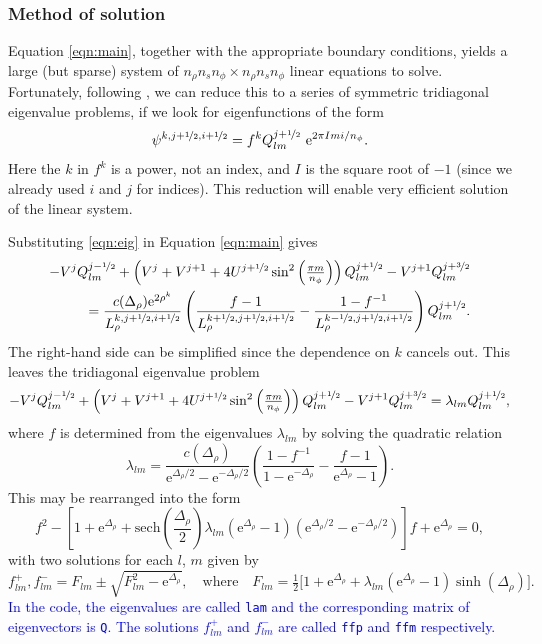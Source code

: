 \documentclass[11pt]{article}
\newcommand{\dr}{\Delta_\rho}
\newcommand{\nr}{n_\rho}
\newcommand{\ns}{n_s}
\newcommand{\nph}{n_\phi}
\newcommand{\half}{\nicefrac{1}{2}}
\newcommand{\thr}{\nicefrac{3}{2}}
\newcommand{\ex}{\,\mathrm{e}}
\begin{document}
\subsubsection{Method of solution}

Equation \eqref{eqn:main}, together with the appropriate boundary conditions, yields a large (but sparse) system of $\nr\ns\nph\times \nr\ns\nph$ linear equations to solve. Fortunately, following \cite{vanballe2000}, we can reduce this to a series of symmetric tridiagonal eigenvalue problems, if we look for eigenfunctions of the form
\begin{equation}
\psi^{k,j+\half,i+\half} = f^kQ_{lm}^{j+\half}\,\ex^{2\pi I mi/\nph}.
\label{eqn:eig}
\end{equation}
Here the $k$ in $f^k$ is a power, not an index, and $I$ is the square root of $-1$ (since we already used $i$ and $j$ for indices). This reduction will enable very efficient solution of the linear system.

Substituting \eqref{eqn:eig} in Equation \eqref{eqn:main} gives
\begin{align}
-V^{j}Q^{j-\half}_{lm} + \left(V^{j} + V^{j+1}+ 4U^{j+\half}\sin^2\left(\tfrac{\pi m}{\nph}\right) \right)Q^{j+\half}_{lm} - V^{j+1}Q^{j+\thr}_{lm} \nonumber\\
= \frac{c(\dr)\mathrm{e}^{2\rho^k}}{L_\rho^{k,j+\half,i+\half}}\left(\frac{f - 1}{L_\rho^{k+\half,j+\half,i+\half}} - \frac{1 - f^{-1}}{L_\rho^{k-\half,j+\half,i+\half}} \right)Q_{lm}^{j+\half}.
\end{align}
The right-hand side can be simplified since the dependence on $k$ cancels out. This leaves the tridiagonal eigenvalue problem
\begin{equation}
-V^{j}Q^{j-\half}_{lm} + \left(V^{j} + V^{j+1}+ 4U^{j+\half}\sin^2\left(\tfrac{\pi m}{\nph}\right) \right)Q^{j+\half}_{lm} - V^{j+1}Q^{j+\thr}_{lm} = \lambda_{lm}Q_{lm}^{j+\half},
\end{equation}
where $f$ is determined from the eigenvalues $\lambda_{lm}$ by solving the quadratic relation
\begin{equation}
\lambda_{lm} = \frac{c(\dr)}{\mathrm{e}^{\dr/2} - \mathrm{e}^{-\dr/2}} \left(\frac{1-f^{-1}}{1-\mathrm{e}^{-\dr}} - \frac{f-1}{\mathrm{e}^{\dr} - 1}\right).
\end{equation}
This may be rearranged into the form
\begin{equation}
f^2 - \left[1 + \mathrm{e}^{\dr} + \mathrm{sech}\left(\frac{\dr}{2}\right)\lambda_{lm}(\mathrm{e}^{\dr}-1)(\mathrm{e}^{\dr/2} - \mathrm{e}^{-\dr/2}) \right]f + \mathrm{e}^{\dr} = 0,
\end{equation}
with two solutions for each $l$, $m$ given by
\begin{equation}
f_{lm}^+, f_{lm}^- = F_{lm} \pm \sqrt{F_{lm}^2 - \mathrm{e}^{\dr}}, \quad \textrm{where} \quad F_{lm} = \tfrac12\Big[1 + \mathrm{e}^{\dr} + \lambda_{lm}(\mathrm{e}^{\dr}-1)\sinh(\dr) \Big].
\end{equation}
\textcolor{blue}{In the code, the eigenvalues are called \texttt{lam} and the corresponding matrix of eigenvectors is \texttt{Q}. The solutions $f_{lm}^+$ and $f_{lm}^-$ are called \texttt{ffp} and \texttt{ffm} respectively.}
\end{document}
